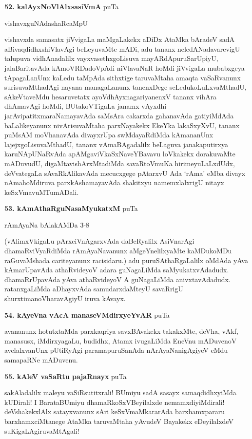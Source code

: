 \medskip
\noindent\textbf{52. kalAyxNoVlAlxsasiVmA} \hfill puTa \pageref{206}

\hfill vishavxguNAdashaRcaMpU

vishavxda samasatx jiVvigaLa maMgaLakekx  aDiDx AtaMka bAradeV sadA aBivaqdidhxshiVlavAgi beLeyuvaMte mADi, adu tananx neledANadavarevigU talupuva vidhAnadalilx vayxvasethxgoLisuva mayARdApuruSarUpiyU, jalaBaritavAda kAmoVRDadoVpAdi niVlavaNaR hoMdi jiVvigaLa mubabxgeya tApagaLanUnx kaLedu taMpAda sithxtige taruvaMtaha amaqta vaSaRvanunx surisuvaMthadAgi nayana managaLanunx tanenxDege seLedukoLuLxvaMthadU, sAkeVtaveMdu hesaruvetatx ayoVdhAyxnagariyanenxV tananx vihAra dhAmavAgi hoMdi, BUtakoVTigaLa janamx vAyxdhi jarAvipatitxmaraNamayavAda saMsAra cakarxda gahanavAda gatiyiMdAda baLalikeyanunx nivArisuvaMtaha parxNayakekx EkeYka lakaSxyXvU, tananx puMsAM moVhanavAda divayxrUpa swMdayaRdiMda kAmananUnx lajejxgoLisuvaMthadU, tananx vAmaBAgadalilx beLaguva janakaputirxya karuNApUNaRvAda apAMgaviVkaSxNaveYBavavu loVkakekx dorakuvaMte mADuvudU, digaMtavishArxMtadiMda savaRtoVmuKa hirimeyuLaLxdUdx, deVvategaLa sAvaRkAlikavAda mecucxgege pAtarxvU Ada `rAma' eMba divayx nAmahoMdiruva parxkAshamayavAda shakitxyu namemxlalxrigU nitayx keSxVmavuMTumADali.

\medskip
\noindent\textbf{53. kAmAthaRguNasaMyukatxM} \hfill puTa \pageref{212}

\hfill rAmAyaNa bAlakAMDa 3-8
 
 (vAlimxVkigaLu pArxciVnAgarxvAda daBeRyalilx AsiVnarAgi dhamaRviVyaRdiMda rAmAyaNavanunx aMgeYnelilxyaMte kaMDukoMDu raGuvaMshada cariteyanunx racisidaru.) adu puruSAthaRgaLalilx oMdAda yAva kAmarUpavAda athaRvideyoV adara guNagaLiMda saMyukatxvAdadudx. dhamaRrUpavAda yAva athaRvideyoV A guNagaLiMda anivxtavAdadudx. ratanxgaLiMda aDhayxvAda samudarxdaMteyU savaRrigU shurxtimanoVharavAgiyU iruva kAvayx.
 
\medskip
\noindent\textbf{54. kAyeVna vAcA manaseVMdirxyeYvAR} \hfill puTa \pageref{219}

avananunx hotutxtaMda parxkaqriya savxBAvakekx takakxMte, deVha, vAkf, manasusx, iMdirxyagaLu, budidhx, Atamx ivugaLiMda EneVnu mADuvenoV avelalxvanUnx pUtiRyAgi paramapuruSanAda nArAyaNanigAgiyeV eMdu samapaRNe mADuvenu.

\medskip
\noindent\textbf{55. kAleV vaSaRtu pajaRnayx} \hfill puTa \pageref{149a}

sakAladalilx maleyu vaSiRsutitxrali! BUmiyu sadA sasayx samaqdidhxyiMda kUDirali! I BarataBUmiyu dhamaRkoSxVBeyilalxde nemamxdiyiMdirali! deVshakekxlAlx satayxvanunx sAri keSxVmaMkararAda barxhamxpararu barxhamxciMtanege AtaMka taruvaMtaha yAvudeV Bayakekx eDeyilalxdeV suKigaLAgiruvaMtAgali!

